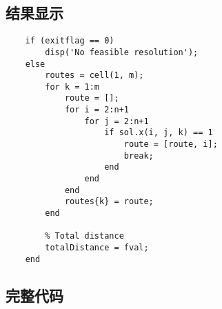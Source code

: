 \subsection{结果显示}
    \begin{lstlisting}
    if (exitflag == 0)
        disp('No feasible resolution');
    else
        routes = cell(1, m);
        for k = 1:m
            route = [];
            for i = 2:n+1
                for j = 2:n+1
                    if sol.x(i, j, k) == 1
                        route = [route, i];
                        break;
                    end
                end
            end
            routes{k} = route;
        end
        
        % Total distance
        totalDistance = fval;
    end
    \end{lstlisting}
\subsection{完整代码}
